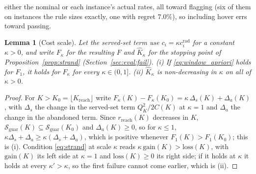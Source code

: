 \documentclass[journal,outdir=./]{IEEEtran}
\newtheorem{lemma}{Lemma}
\newcommand{\Kr}{K_{\mathrm{reach}}}
\begin{document}
either the nominal or each instance's actual rates, all toward flagging (six of them on instances the rule sizes exactly, one with regret $7.0\%$), so including hover errs toward passing.

\begin{lemma}[Cost scale]\label{lem:scale}
Let the served-set term use $c_i=\kappa c_i^{\mathrm{rad}}$ for a constant $\kappa>0$, and write $F_\kappa$ for the resulting $F$ and $\hat K_\kappa$ for the stopping point of Proposition~\ref{prop:strand} (Section~\ref{sec:eval:fail}). (i) If \eqref{eq:window_apriori} holds for $F_1$, it holds for $F_\kappa$ for every $\kappa\in(0,1]$. (ii) $\hat K_\kappa$ is non-decreasing in $\kappa$ on all of $\kappa>0$.
\end{lemma}
\begin{proof}
For $K>K_0=\lfloor\Kr\rfloor$ write $F_\kappa(K)-F_\kappa(K_0)=\kappa\,\Delta_s(K)+\Delta_a(K)$, with $\Delta_s$ the change in the served-set term $Q_K^2/2C(K)$ at $\kappa=1$ and $\Delta_a$ the change in the abandoned term. Since $r_{\mathrm{reach}}(K)$ decreases in $K$, $\mathcal{S}_{\mathrm{guar}}(K)\subseteq\mathcal{S}_{\mathrm{guar}}(K_0)$ and $\Delta_a(K)\ge0$, so for $\kappa\le1$, $\kappa\Delta_s+\Delta_a\ge\kappa(\Delta_s+\Delta_a)$, which is positive whenever $F_1(K)>F_1(K_0)$; this is (i). Condition \eqref{eq:strand} at scale $\kappa$ reads $\kappa\,\mathrm{gain}(K)>\mathrm{loss}(K)$, with $\mathrm{gain}(K)$ its left side at $\kappa=1$ and $\mathrm{loss}(K)\ge0$ its right side; if it holds at $\kappa$ it holds at every $\kappa'>\kappa$, so the first failure cannot come earlier, which is (ii).
\end{proof}
\end{document}
